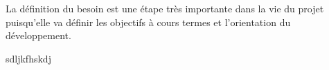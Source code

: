 \label{sec:3.1-besoin}

La définition du besoin est une étape très importante dans la vie du projet puisqu'elle va définir les objectifs à cours termes et l'orientation du développement. 

sdljkfhskdj